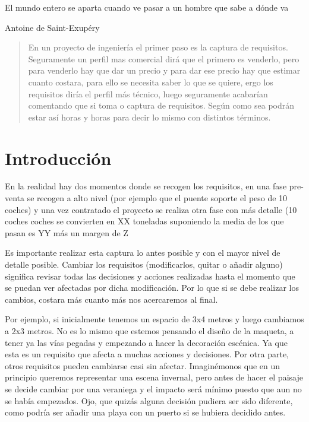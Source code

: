 
\epigraph{El mundo entero se aparta cuando ve pasar a un hombre que sabe a dónde va}{Antoine de Saint-Exupéry }

\begin{abstract}
    En un proyecto de ingeniería el primer paso es la captura de requisitos. Seguramente un perfil mas comercial dirá que el primero es venderlo, pero para venderlo hay que dar un precio y para dar ese precio hay que estimar cuanto costara, para ello se necesita saber lo que se quiere, ergo los requisitos diría el perfil más técnico, luego seguramente acabarían comentando que si toma o captura de requisitos. Según como sea podrán estar así horas y horas para decir lo mismo con distintos términos. 
\end{abstract}

\section{Introducción}

En la realidad hay dos momentos donde se recogen los requisitos, en una fase pre-venta se recogen a alto nivel (por ejemplo que el puente soporte el peso de 10 coches) y una vez contratado el proyecto se realiza otra fase con más detalle (10 coches coches se convierten en XX toneladas suponiendo la media de los que pasan es YY más un margen de Z%

 
Es importante realizar esta captura lo antes posible y con el mayor nivel de detalle posible. Cambiar los requisitos (modificarlos, quitar o añadir alguno) significa revisar todas las decisiones y acciones realizadas hasta el momento que se puedan ver afectadas por dicha modificación. Por lo que si se debe realizar los cambios, costara más cuanto más nos acercaremos al final. 

 
Por ejemplo, si inicialmente tenemos un espacio de 3x4 metros y luego cambiamos a 2x3 metros. No es lo mismo que estemos pensando el diseño de la maqueta, a tener ya las vías pegadas y empezando a hacer la decoración escénica. Ya que esta es un requisito que afecta a muchas acciones y decisiones. Por otra parte, otros requisitos pueden cambiarse casi sin afectar. Imaginémonos que en un principio queremos representar una escena invernal, pero antes de hacer el paisaje se decide cambiar por una veraniega y el impacto será mínimo puesto que aun no se había empezados. Ojo, que quizás alguna decisión pudiera ser sido diferente, como podría ser añadir una playa con un puerto si se hubiera decidido antes. 

